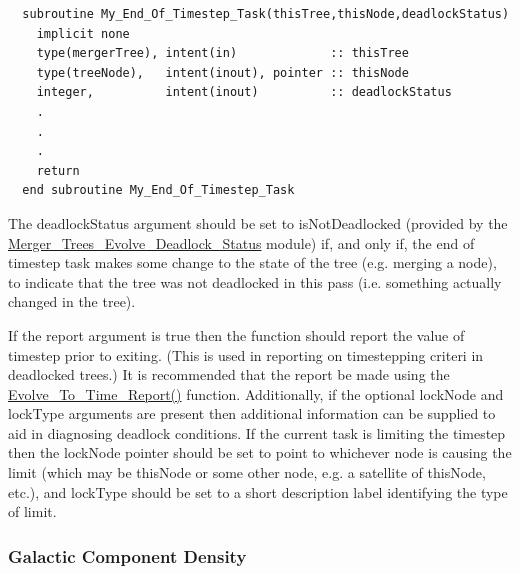 \begin{verbatim}
  subroutine My_End_Of_Timestep_Task(thisTree,thisNode,deadlockStatus)
    implicit none
    type(mergerTree), intent(in)             :: thisTree
    type(treeNode),   intent(inout), pointer :: thisNode
    integer,          intent(inout)          :: deadlockStatus
    .
    .
    .
    return
  end subroutine My_End_Of_Timestep_Task
\end{verbatim}
The {\normalfont \ttfamily deadlockStatus} argument should be set to {\normalfont \ttfamily isNotDeadlocked} (provided by the \hyperlink{merger_trees.evolve.deadlock_options.F90:merger_trees_evolve_deadlock_status}{\normalfont \ttfamily Merger\_Trees\_Evolve\_Deadlock\_Status} module) if, and only if, the end of timestep task makes some change to the state of the tree (e.g. merging a node), to indicate that the tree was not deadlocked in this pass (i.e. something actually changed in the tree).

If the {\normalfont \ttfamily report} argument is {\normalfont \ttfamily true} then the function should report the value of {\normalfont \ttfamily timestep} prior to exiting. (This is used in reporting on timestepping criteri in deadlocked trees.) It is recommended that the report be made using the \hyperlink{merger_trees.evolve.timesteps.report.F90:evolve_to_time_reports:evolve_to_time_report}{\normalfont \ttfamily Evolve\_To\_Time\_Report()} function. Additionally, if the optional {\normalfont \ttfamily lockNode} and {\normalfont \ttfamily lockType} arguments are present then additional information can be supplied to aid in diagnosing deadlock conditions. If the current task is limiting the timestep then the {\normalfont \ttfamily lockNode} pointer should be set to point to whichever node is causing the limit (which may be {\normalfont \ttfamily thisNode} or some other node, e.g. a satellite of {\normalfont \ttfamily thisNode}, etc.), and {\normalfont \ttfamily lockType} should be set to a short description label identifying the type of limit.

\subsubsection{Galactic Component Density}\label{sec:GalacticComponentDensity}

